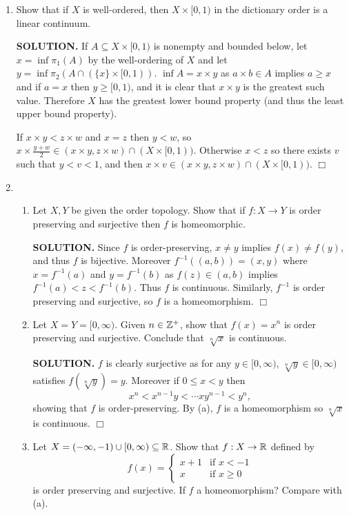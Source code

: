 \documentclass{article}
\begin{document}
\begin{enumerate}
    \item Show that if $X$ is well-ordered, then $X \times [0, 1)$ in the dictionary order is a linear continuum.

    {\bf SOLUTION.} If $A \subseteq X \times [0, 1)$ is nonempty and bounded below, let $x = \inf \pi_1(A)$ by the well-ordering of $X$ and let $y = \inf \pi_2(A \cap (\{x\} \times [0, 1))$. $\inf A = x \times y$ as $a \times b \in A$ implies $a \geq x$ and if $a = x$ then $y \geq [0, 1)$, and it is clear that $x \times y$ is the greatest such value. Therefore $X$ has the greatest lower bound property (and thus the least upper bound property).

    If $x \times y < z \times w$ and $x = z$ then $y < w$, so $x \times \frac{y+w}2 \in (x \times y, z \times w) \cap (X \times [0, 1))$. Otherwise $x < z$ so there exists $v$ such that $y < v < 1$, and then $x \times v \in (x \times y, z \times w) \cap (X \times [0, 1))$. $\Box$

    \item \begin{enumerate}
        \item Let $X, Y$ be given the order topology. Show that if $f: X \rightarrow Y$ is order preserving and surjective then $f$ is homeomorphic.

        {\bf SOLUTION.} Since $f$ is order-preserving, $x \neq y$ implies $f(x) \neq f(y)$, and thus $f$ is bijective. Moreover $f^{-1}((a, b)) = (x, y)$ where $x = f^{-1}(a)$ and $y=f^{-1}(b)$ as $f(z) \in (a, b)$ implies $f^{-1}(a) < z < f^{-1}(b)$. Thus $f$ is continuous. Similarly, $f^{-1}$ is order preserving and surjective, so $f$ is a homeomorphism. $\Box$

        \item Let $X = Y = [0, \infty)$. Given $n \in \mathbb{Z}^+$, show that $f(x) = x^n$ is order preserving and surjective. Conclude that $\sqrt[n]{x}$ is continuous.

        {\bf SOLUTION.} $f$ is clearly surjective as for any $y\in [0, \infty)$, $\sqrt[n]y \in [0, \infty)$ satisfies $f(\sqrt[n]y) = y.$ Moreover if $0 \leq x < y$ then 
        $$x^n < x^{n-1}y < \cdots xy^{n-1} < y^n,$$
        showing that $f$ is order-preserving. By (a), $f$ is a homeomorphism so $\sqrt[n]x$ is continuous. $\Box$

        \item Let $X = (-\infty, -1) \cup[0, \infty) \subseteq \mathbb{R}$. Show that $f: X \rightarrow \mathbb{R}$ defined by
        $$f(x) = \begin{cases}
            x+1 &\text{if }x< -1 \\
            x &\text{if } x \geq 0
        \end{cases}$$
        is order preserving and surjective. If $f$ a homeomorphism? Compare with (a).


\end{enumerate}
\end{enumerate}
\end{document}
